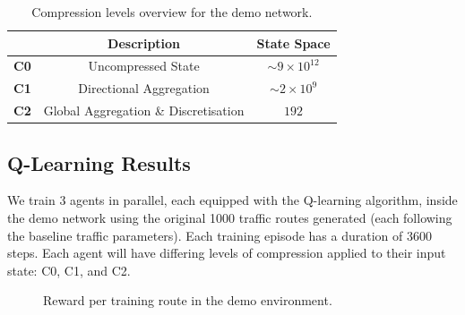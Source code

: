 \documentclass[a4paper]{report}
\begin{document}
\begin{table}[H]
  \centering
  \begin{tabular}{c c c}
    \hline
    & \textbf{Description} & \textbf{State Space}\\
    \hline
    \textbf{C0} & Uncompressed State & $\sim 9\times10^{12}$ \\
    \textbf{C1} & Directional Aggregation & $\sim 2\times10^{9}$ \\
    \textbf{C2} & Global Aggregation \& Discretisation & $192$ \\
    \hline
  \end{tabular}
  \caption{Compression levels overview for the demo network.}
\end{table}

\subsection{Q-Learning Results}

We train 3 agents in parallel, each equipped with the Q-learning algorithm, inside the demo network using the original 1000 traffic routes generated (each following the baseline traffic parameters). Each training episode has a duration of 3600 steps. Each agent will have differing levels of compression applied to their input state: C0, C1, and C2.

\begin{figure}[H]
  \centering
  \caption{Reward per training route in the demo environment.}
  \label{fig:compressed_q_learning_demo_train_1}
\end{figure}
\end{document}
